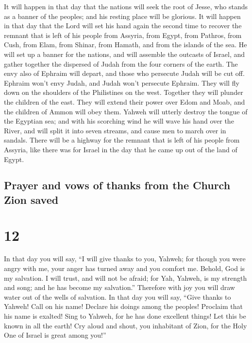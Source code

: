  It will happen in that day that the nations will seek
the root of Jesse, who stands as a banner of the peoples; and his
resting place will be glorious.  It will happen in that
day that the Lord will set his hand again the second time to recover the
remnant that is left of his people from Assyria, from Egypt, from
Pathros, from Cush, from Elam, from Shinar, from Hamath, and from the
islands of the sea.  He will set up a banner for the
nations, and will assemble the outcasts of Israel, and gather together
the dispersed of Judah from the four corners of the earth.
 The envy also of Ephraim will depart, and those who
persecute Judah will be cut off. Ephraim won't envy Judah, and Judah
won't persecute Ephraim.  They will fly down on the
shoulders of the Philistines on the west. Together they will plunder the
children of the east. They will extend their power over Edom and Moab,
and the children of Ammon will obey them.  Yahweh will
utterly destroy the tongue of the Egyptian sea; and with his scorching
wind he will wave his hand over the River, and will split it into seven
streams, and cause men to march over in sandals.  There
will be a highway for the remnant that is left of his people from
Assyria, like there was for Israel in the day that he came up out of the
land of Egypt.

\hypertarget{prayer-and-vows-of-thanks-from-the-church-zion-saved}{%
\subsection{Prayer and vows of thanks from the Church Zion
saved}\label{prayer-and-vows-of-thanks-from-the-church-zion-saved}}

\hypertarget{section-11}{%
\section{12}\label{section-11}}

 In that day you will say, ``I will give thanks to you,
Yahweh; for though you were angry with me, your anger has turned away
and you comfort me.  Behold, God is my salvation. I will
trust, and will not be afraid; for Yah, Yahweh, is my strength and song;
and he has become my salvation.''  Therefore with joy you
will draw water out of the wells of salvation.  In that
day you will say, ``Give thanks to Yahweh! Call on his name! Declare his
doings among the peoples! Proclaim that his name is exalted!
 Sing to Yahweh, for he has done excellent things! Let
this be known in all the earth!  Cry aloud and shout, you
inhabitant of Zion, for the Holy One of Israel is great among you!''

